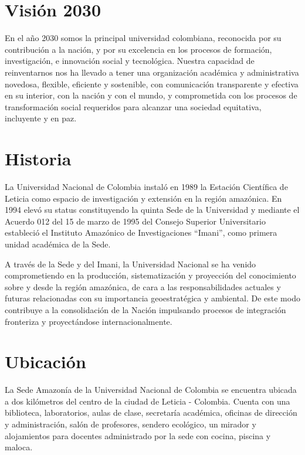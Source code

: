 \documentclass[
]{book}
\begin{document}
\hypertarget{vision}{%
\section*{Visión 2030}\label{vision}}

En el año 2030 somos la principal universidad colombiana, reconocida por su contribución a la
nación, y por su excelencia en los procesos de formación, investigación, e innovación social y
tecnológica. Nuestra capacidad de reinventarnos nos ha llevado a tener una organización académica y administrativa novedosa, flexible, eficiente y sostenible, con comunicación transparente y efectiva en su interior, con la nación y con el mundo, y comprometida con los procesos
de transformación social requeridos para alcanzar una sociedad equitativa, incluyente y en paz.

\hypertarget{hist}{%
\section*{Historia}\label{hist}}

La Universidad Nacional de Colombia instaló en 1989 la Estación Científica de Leticia como espacio de investigación y extensión en la región amazónica. En 1994 elevó su status constituyendo la quinta Sede de la Universidad y mediante el Acuerdo 012 del 15 de marzo de 1995 del Consejo Superior Universitario estableció el Instituto Amazónico de Investigaciones ``Imani'', como primera unidad académica de la Sede.

A través de la Sede y del Imani, la Universidad Nacional se ha venido comprometiendo en la producción, sistematización y proyección del conocimiento sobre y desde la región amazónica, de cara a las responsabilidades actuales y futuras relacionadas con su importancia geoestratégica y ambiental. De este modo contribuye a la consolidación de la Nación impulsando procesos de integración fronteriza y proyectándose internacionalmente.

\hypertarget{ubica}{%
\section*{Ubicación}\label{ubica}}

La Sede Amazonía de la Universidad Nacional de Colombia se encuentra ubicada a dos kilómetros del centro de la ciudad de Leticia - Colombia. Cuenta con una biblioteca, laboratorios, aulas de clase, secretaría académica, oficinas de dirección y administración, salón de profesores, sendero ecológico, un mirador y alojamientos para docentes administrado por la sede con cocina, piscina y maloca.
\end{document}
